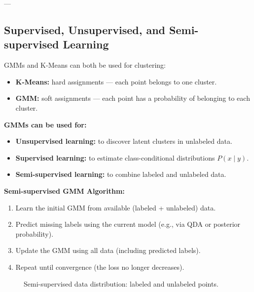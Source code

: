 ---

\subsection{Supervised, Unsupervised, and Semi-supervised Learning}

GMMs and K-Means can both be used for clustering:

\begin{itemize}
    \item \textbf{K-Means:} hard assignments — each point belongs to one cluster.
    \item \textbf{GMM:} soft assignments — each point has a probability of belonging to each cluster.
\end{itemize}

\textbf{GMMs can be used for:}
\begin{itemize}
    \item \textbf{Unsupervised learning:} to discover latent clusters in unlabeled data.
    \item \textbf{Supervised learning:} to estimate class-conditional distributions \( P(x \mid y) \).
    \item \textbf{Semi-supervised learning:} to combine labeled and unlabeled data.
\end{itemize}

\textbf{Semi-supervised GMM Algorithm:}
\begin{enumerate}
    \item Learn the initial GMM from available (labeled + unlabeled) data.
    \item Predict missing labels using the current model (e.g., via QDA or posterior probability).
    \item Update the GMM using all data (including predicted labels).
    \item Repeat until convergence (the loss no longer decreases).
\end{enumerate}

\begin{figure}[h]
\centering
{}
\caption{Semi-supervised data distribution: labeled and unlabeled points.}
\end{figure}

